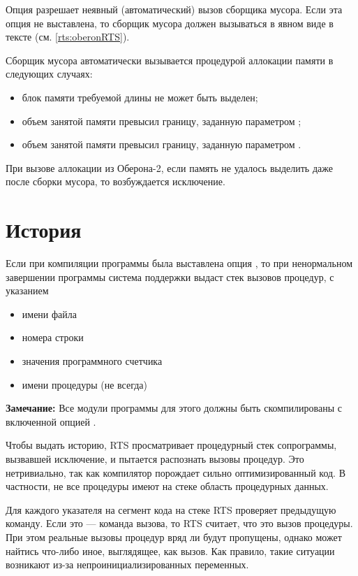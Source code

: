 Опция  разрешает неявный (автоматический) вызов сборщика мусора.
Если эта опция не выставлена, то сборщик мусора
должен вызываться в явном виде в тексте (см. \ref{rts:oberonRTS}).

Сборщик мусора автоматически вызывается процедурой аллокации
памяти в следующих случаях:
\begin{itemize}
\item  блок памяти требуемой длины не может быть выделен;
\item  объем занятой памяти превысил границу, заданную параметром
       ;
\item  объем занятой памяти превысил границу, заданную параметром
       .
\end{itemize}
При вызове аллокации из Оберона-2, 
если память не удалось выделить даже после сборки мусора,
то возбуждается исключение.

\section{История}\label{rts:history}

Если при компиляции программы была выставлена опция ,
то при ненормальном завершении программы система поддержки выдаст
стек вызовов процедур, с указанием
\begin{itemize}
\item имени файла
\item номера строки
\item значения программного счетчика %
\item имени процедуры (не всегда)
\end{itemize}
{\bf Замечание:} Все модули программы для этого должны быть скомпилированы с
включенной опцией .

\ifgencode
Чтобы выдать историю, RTS просматривает процедурный стек сопрограммы,
вызвавшей исключение, и пытается распознать вызовы процедур. Это 
нетривиально, так как компилятор порождает сильно оптимизированный код.
В частности, не все процедуры имеют на стеке область процедурных данных.

Для каждого указателя на сегмент кода на стеке RTS проверяет предыдущую
команду. Если это --- команда вызова, то RTS считает, что это 
вызов процедуры. При этом реальные вызовы процедур вряд ли будут пропущены,
однако может найтись что-либо иное, выглядящее, как вызов. Как правило,
такие ситуации возникают из-за непроинициализированных переменных.

